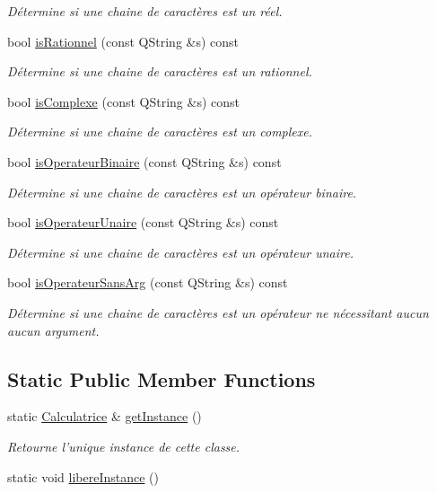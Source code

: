 \begin{DoxyCompactItemize}
\begin{DoxyCompactList}\small\item\em \-Détermine si une chaine de caractères est un réel. \end{DoxyCompactList}\item 
bool \hyperlink{classCalculatrice_a819763881ef5f56d7f3d43e76040b2d2}{is\-Rationnel} (const \-Q\-String \&s) const 
\begin{DoxyCompactList}\small\item\em \-Détermine si une chaine de caractères est un rationnel. \end{DoxyCompactList}\item 
bool \hyperlink{classCalculatrice_ae54ad074ece7af59c66c0ade18477c98}{is\-Complexe} (const \-Q\-String \&s) const 
\begin{DoxyCompactList}\small\item\em \-Détermine si une chaine de caractères est un complexe. \end{DoxyCompactList}\item 
bool \hyperlink{classCalculatrice_ae8e493fdbe9f85ecb9157abf0d2d0c35}{is\-Operateur\-Binaire} (const \-Q\-String \&s) const 
\begin{DoxyCompactList}\small\item\em \-Détermine si une chaine de caractères est un opérateur binaire. \end{DoxyCompactList}\item 
bool \hyperlink{classCalculatrice_a7a31fa3cb1e95ea24d37affe1492486e}{is\-Operateur\-Unaire} (const \-Q\-String \&s) const 
\begin{DoxyCompactList}\small\item\em \-Détermine si une chaine de caractères est un opérateur unaire. \end{DoxyCompactList}\item 
bool \hyperlink{classCalculatrice_abc8e063f53b0d0a14da786fbcb604f29}{is\-Operateur\-Sans\-Arg} (const \-Q\-String \&s) const 
\begin{DoxyCompactList}\small\item\em \-Détermine si une chaine de caractères est un opérateur ne nécessitant aucun aucun argument. \end{DoxyCompactList}\end{DoxyCompactItemize}
\subsection*{\-Static \-Public \-Member \-Functions}
\begin{DoxyCompactItemize}
\item 
static \hyperlink{classCalculatrice}{\-Calculatrice} \& \hyperlink{classCalculatrice_a6311c8e75ac47e9f43ecd47ebc22c10b}{get\-Instance} ()
\begin{DoxyCompactList}\small\item\em \-Retourne l'unique instance de cette classe. \end{DoxyCompactList}\item 
static void \hyperlink{classCalculatrice_aa974f5b58c583ef3aaee055eac238466}{libere\-Instance} ()
\end{DoxyCompactItemize}


